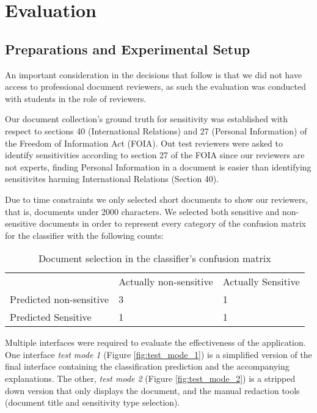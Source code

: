 \documentclass{l4proj}
\begin{document}
\chapter{Evaluation}

\section{Preparations and Experimental Setup}

An important consideration in the decisions that follow is that we did not have access to professional document reviewers, as such the evaluation was conducted with students in the role of reviewers. 

Our document collection's ground truth for sensitivity was established with respect to sections 40 (International Relations) and 27 (Personal Information) of the Freedom of Information Act (FOIA).
Out test reviewers were asked to identify sensitivities according to section 27 of the FOIA since our reviewers are not experts, finding Personal Information in a document is easier than identifying sensitivites harming International Relations (Section 40).

Due to time constraints we only selected short documents to show our reviewers, that is, documents under 2000 characters. 
We selected both sensitive and non-sensitive documents in order to represent every category of the confusion matrix for the classifier with the following counts:

\begin{table}[H]
    \begin{tabular}{l ll}
                                & Actually non-sensitive & Actually Sensitive \\ 
        Predicted non-sensitive & 3                      & 1                  \\
        Predicted Sensitive     & 1                      & 1                 
    \end{tabular}
    \caption{Document selection in the classifier's confusion matrix}
    \label{tab:confusion-matrix-selection}
\end{table}


Multiple interfaces were required to evaluate the effectiveness of the application.
One interface \textit{test mode 1} (Figure \ref{fig:test_mode_1}) is a simplified version of the final interface containing the classification prediction and the accompanying explanations.
The other, \textit{test mode 2} (Figure \ref{fig:test_mode_2}) is a stripped down version that only displays the document, and the manual redaction tools (document title and sensitivity type selection).
\end{document}
